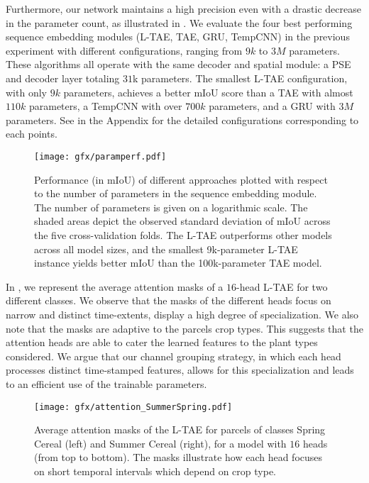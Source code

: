 \documentclass[runningheads]{llncs}
\begin{document}
Furthermore, our network maintains a high precision even with a drastic decrease in the parameter count, as illustrated in .
We evaluate the four best performing sequence embedding modules (L-TAE, TAE, GRU, TempCNN) in the previous experiment with different configurations, ranging from $9k$ to $3M$ parameters. These algorithms all operate with the same decoder and spatial module: a PSE and decoder layer totaling $31$k parameters.
The smallest L-TAE configuration, with only $9k$ parameters, achieves a better mIoU score than a TAE with almost $110k$ parameters, a TempCNN with over $700k$ parameters, and a GRU with $3M$ parameters. See  in the Appendix for the detailed configurations  corresponding to each points.
\begin{figure}[]
\texttt{[image: gfx/paramperf.pdf]}
\caption{Performance (in mIoU) of different approaches plotted with respect to the number of parameters in the sequence embedding module. The number of parameters is given on a logarithmic scale. The shaded areas depict the observed standard deviation of mIoU across the five cross-validation folds. The L-TAE outperforms other models across all model sizes, and the smallest 9k-parameter L-TAE instance yields better mIoU than the 100k-parameter TAE model.  }
\label{fig:perfparam}
\end{figure}



In , we represent the average attention masks of a $16$-head L-TAE for two different classes. We observe that the masks of the different heads focus on narrow and distinct time-extents, \ie display a high degree of specialization. We also note that the masks are adaptive to the parcels crop types. This suggests that  the attention heads are able to cater the learned features to the plant types considered. We argue that our channel grouping strategy, in which each head processes distinct time-stamped features, allows for this specialization and leads to an efficient use of the trainable parameters.

\begin{figure}
    \centering
    \texttt{[image: gfx/attention\_SummerSpring.pdf]}
    \caption{Average attention masks of the L-TAE for parcels of classes Spring Cereal (left) and Summer Cereal (right), for a model with $16$ heads (from top to bottom). The masks illustrate how each head focuses on short temporal intervals which depend on crop type. 
}
    \label{fig:masks}
\end{figure}
\end{document}
